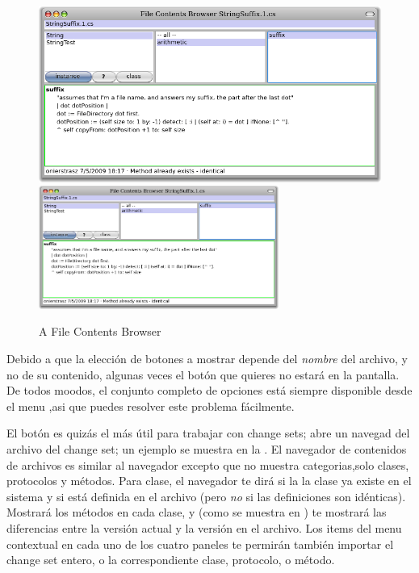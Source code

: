 \documentclass[spanish,a4paper,10pt,twoside]{book}
\begin{document}
\begin{figure}[btp]
	\begin{center}
	\ifluluelse
		{\includegraphics[width=\textwidth]{fileContentsBrowser}}
		{\includegraphics[width=0.7\textwidth]{fileContentsBrowser}}
	\end{center}
	\caption{A File Contents Browser}
\end{figure}

Debido a que la elecci\'on de botones a mostrar depende del \emph{nombre} del
archivo, y no de su contenido, algunas veces el bot\'on que quieres no
estar\'a en la pantalla. De todos moodos, el conjunto completo de opciones está
siempre disponible desde el menu \actclick {},asi que puedes
resolver este problema f\'acilmente.

El bot\'on  es quiz\'as el m\'as \'util para trabajar con change
sets; abre un navegad del archivo del change set; un ejemplo se muestra en la
. El navegador de contenidos de archivos es
similar al navegador excepto que no muestra categorias,solo clases, protocolos
y m\'etodos. Para clase, el navegador te dir\'a si la la clase ya existe en el
sistema y si está definida en el archivo (pero \emph{no} si las definiciones son
id\'enticas). Mostrar\'a los m\'etodos en cada clase, y (como se muestra en
) te mostrar\'a las diferencias entre la versi\'on
actual y la versi\'on en el archivo. Los items del menu contextual en cada uno
de los cuatro paneles te permir\'an tambi\'en importar el change set entero, o
la correspondiente clase, protocolo, o m\'etodo.
\end{document}
